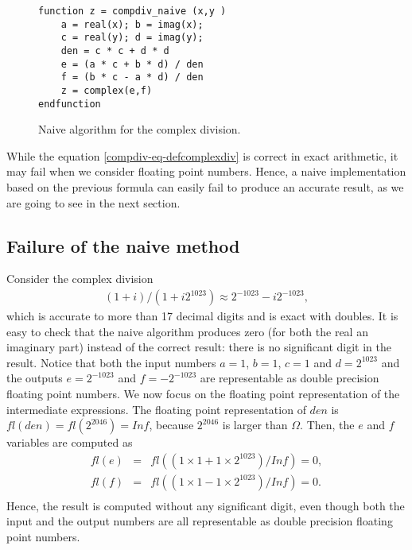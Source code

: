 \documentclass{paper}
\begin{document}
\begin{figure}
\caption{Naive algorithm for the complex division.}
\label{fig-compdiv-algonaive}
\lstset{language=scilabscript}
\begin{lstlisting}
function z = compdiv_naive (x,y )
    a = real(x); b = imag(x);
    c = real(y); d = imag(y);
    den = c * c + d * d
    e = (a * c + b * d) / den
    f = (b * c - a * d) / den
    z = complex(e,f)
endfunction
\end{lstlisting}
\end{figure}


While the equation \ref{compdiv-eq-defcomplexdiv} is correct  
in exact arithmetic, it may fail when we consider floating point 
numbers. 
Hence, a naive implementation based on the previous 
formula can easily fail to produce an accurate result, as 
we are going to see in the next section. 

\subsection{Failure of the naive method}
\label{section-naivefailures}

Consider the complex division 
\begin{eqnarray}
\label{eq-cd-10307}
(1 + i)/(1 + i 2^{1023}) \approx 2^{-1023} - i 2^{-1023},
\end{eqnarray}
which is accurate to more than 17 decimal digits and 
is exact with doubles.
It is easy to check that the naive algorithm produces zero (for 
both the real an imaginary part) instead of the 
correct result: there is no significant digit in the result. 
Notice that both the input numbers $a=1$, $b=1$, $c=1$ and $d=2^{1023}$ and the 
outputs $e=2^{-1023}$ and $f=-2^{-1023}$ are representable as double precision
floating point numbers. 
We now focus on the floating point representation of the intermediate expressions.
The floating point representation of $den$ is $fl(den) = fl(2^{2046}) = Inf$,
because $2^{2046}$ is larger than $\Omega$. 
Then, the $e$ and $f$ variables are computed as 
\begin{eqnarray}
fl(e) 
&=& fl((1\times 1 + 1\times 2^{1023})/Inf)  = 0, \nonumber \\
fl(f) 
&=& fl((1\times 1 - 1\times 2^{1023})/Inf)  = 0. \nonumber  \\
\end{eqnarray}
Hence, the result is computed without any significant digit,
even though both the input and the output numbers are all representable as double precision
floating point numbers.
\end{document}
